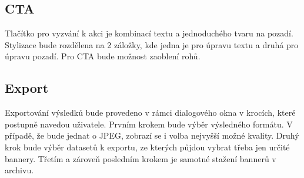         \subsection{CTA}
        Tlačítko pro vyzvání k akci je kombinací textu a jednoduchého tvaru na pozadí. Stylizace bude rozdělena na 2 záložky, kde jedna je pro úpravu textu a
        druhá pro úpravu pozadí. Pro CTA bude možnost zaoblení rohů.

        \subsection{Export}
        Exportování výsledků bude provedeno v rámci dialogového okna v krocích, které postupně navedou uživatele.
        Prvním krokem bude výběr výsledného formátu. V případě, že bude jednat o JPEG, zobrazí se i volba nejvyšší možné kvality.
        Druhý krok bude výběr datasetů k exportu, ze kterých půjdou vybrat třeba jen určité bannery. Třetím a zároveň posledním krokem je
        samotné stažení bannerů v archivu. 




\endinput